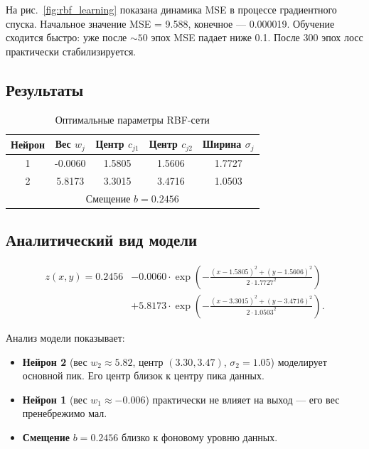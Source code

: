 На рис.~\ref{fig:rbf_learning} показана динамика MSE в процессе градиентного спуска. Начальное значение MSE = 9.588, конечное --- 0.000019. Обучение сходится быстро: уже после $\sim 50$ эпох MSE падает ниже 0.1. После 300 эпох лосс практически стабилизируется.

\subsection{Результаты}

\begin{table}[H]
    \centering
    \caption{Оптимальные параметры RBF-сети}
    \label{tab:rbf_params}
    \begin{tabular}{|c|c|c|c|c|}
        \hline
        \textbf{Нейрон} & \textbf{Вес $w_j$} & \textbf{Центр $c_{j1}$} & \textbf{Центр $c_{j2}$} & \textbf{Ширина $\sigma_j$} \\
        \hline
        1 & -0.0060 & 1.5805 & 1.5606 & 1.7727 \\
        2 & 5.8173 & 3.3015 & 3.4716 & 1.0503 \\
        \hline
        \multicolumn{5}{|c|}{Смещение $b = 0.2456$} \\
        \hline
    \end{tabular}
\end{table}

\subsection{Аналитический вид модели}

\begin{equation}\label{eq:rbf_result}
    \begin{aligned}
        z(x,y) = 0.2456 &- 0.0060 \cdot \exp\left(-\frac{(x - 1.5805)^2 + (y - 1.5606)^2}{2 \cdot 1.7727^2}\right) \\
                         &+ 5.8173 \cdot \exp\left(-\frac{(x - 3.3015)^2 + (y - 3.4716)^2}{2 \cdot 1.0503^2}\right).
    \end{aligned}
\end{equation}

Анализ модели показывает:
\begin{itemize}
    \item \textbf{Нейрон 2} (вес $w_2 \approx 5.82$, центр $(3.30, 3.47)$, $\sigma_2 = 1.05$) моделирует основной пик. Его центр близок к центру пика данных.
    \item \textbf{Нейрон 1} (вес $w_1 \approx -0.006$) практически не влияет на выход --- его вес пренебрежимо мал.
    \item \textbf{Смещение} $b = 0.2456$ близко к фоновому уровню данных.
\end{itemize}

